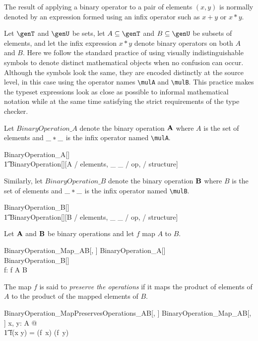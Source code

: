 \documentclass{amsart}
\begin{document}
The result of applying a binary operator to a pair of elements $(x, y)$ 
is normally denoted by an expression formed using an infix operator such as $x + y$ or $x * y$.

Let $\genT$ and $\genU$ be sets, 
let $A \subseteq \genT$ and $B \subseteq \genU$ be subsets of elements,
and let the infix expression $x * y$ denote binary operators on both $A$ and $B$.
Here we follow the standard practice of using visually indistinguishable symbols to denote distinct mathematical
objects when no confusion can occur.
Although the symbols look the same, they are encoded distinctly at the source level,
in this case using the operator names \verb|\mulA| and \verb|\mulB|.
This practice makes the typeset expressions look as close as possible to informal mathematical notation
while at the same time satisfying the strict requirements of the type checker.

Let $BinaryOperation\_A$ denote the binary operation $\mathbf{A}$ where $A$ is the set of elements and 
$\_  \mathbin{*} \_$ is the infix operator named \verb|\mulA|.
\begin{zed}
	BinaryOperation\_A[\genT]  \\
	\t1	BinaryOperation[\genT][A / elements, \_ \mulA \_ / op, \strucA / structure]
\end{zed}

Similarly, let $BinaryOperation\_B$ denote the binary operation $\mathbf{B}$ where $B$ is the set of elements and 
$\_ \mathbin{*} \_$ is the infix operator named \verb|\mulB|.
\begin{zed}
	BinaryOperation\_B[\genT]  \\
	\t1	BinaryOperation[\genT][B / elements, \_ \mulB \_ / op, \strucB / structure]
\end{zed}

Let $\mathbf{A}$ and $\mathbf{B}$ be binary operations and let $f$ map $A$ to $B$.
\begin{schema}{BinaryOperation\_Map\_AB}[\genT, \genU]
	BinaryOperation\_A[\genT] \\
	BinaryOperation\_B[\genU] \\
	f: \genT \pfun \genU
\where
	f \in A \fun B
\end{schema}

The map $f$ is said to {\em preserve the operations} if it maps the product of elements of $A$ to 
the product of the mapped elements of $B$.
\begin{schema}{BinaryOperation\_MapPreservesOperations\_AB}[\genT, \genU]
	BinaryOperation\_Map\_AB[\genT, \genU]
\where
	\forall x, y: A @ \\
	\t1	f(x \mulA y) = (f~x) \mulB (f~y)
\end{schema}
\end{document}
